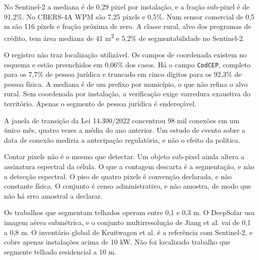 No Sentinel-2 a mediana é de 0,29 pixel por instalação, e a fração sub-pixel é
de 91,2\%. No CBERS-4A WPM são 7,25 pixels e 0,5\%. Num sensor comercial de
0,5 m são 116 pixels e fração próxima de zero. A classe rural, alvo dos
programas de crédito, tem área mediana de 41 m\textsuperscript{2} e 5,2\% de
segmentabilidade no Sentinel-2.


 O registro não traz localização
utilizável. Os campos de coordenada existem no esquema e estão preenchidos em
0,06\% dos casos. Há o campo \texttt{CodCEP}, completo para os 7,7\% de pessoa
jurídica e truncado em cinco dígitos para os 92,3\% de pessoa física. A mediana
é de um prefixo por município, o que não refina o alvo rural. Sem coordenada por
instalação, a verificação exige varredura exaustiva do território. Apenas o
segmento de pessoa jurídica é endereçável.

 A janela de transição da Lei
14.300/2022 concentrou 98 mil conexões em um único mês, quatro vezes a média do
ano anterior. Um estudo de evento sobre a data de conexão mediria a antecipação
regulatória, e não o efeito da política.

\begin{objecao}
Contar pixels não é o mesmo que detectar. Um objeto sub-pixel ainda altera a
assinatura espectral da célula. O que a contagem descarta é a segmentação, e não
a detecção espectral. O piso de quatro pixels é convenção declarada, e não
constante física. O conjunto é censo administrativo, e não amostra, de modo que
não há erro amostral a declarar.
\end{objecao}

 Os trabalhos que segmentam telhados operam entre
0,1 e 0,3 m. O DeepSolar \cite{yu2018} usa imagem aérea submétrica, e o conjunto
multirresolução de Jiang et al. \cite{jiang2021} vai de 0,1 a 0,8 m. O
inventário global de Kruitwagen et al. \cite{kruitwagen2021} é a referência com
Sentinel-2, e cobre apenas instalações acima de 10 kW. Não foi localizado
trabalho que segmente telhado residencial a 10 m.
